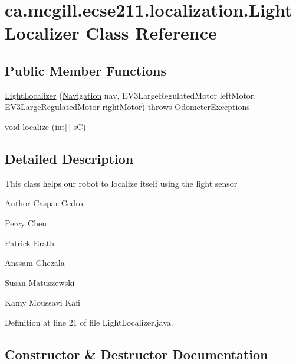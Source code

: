 \hypertarget{classca_1_1mcgill_1_1ecse211_1_1localization_1_1_light_localizer}{}\section{ca.\+mcgill.\+ecse211.\+localization.\+Light\+Localizer Class Reference}
\label{classca_1_1mcgill_1_1ecse211_1_1localization_1_1_light_localizer}
\subsection*{Public Member Functions}
\begin{DoxyCompactItemize}
\item 
\hyperlink{classca_1_1mcgill_1_1ecse211_1_1localization_1_1_light_localizer_aa37a75b7c32c02fe261845021f0734b7}{Light\+Localizer} (\hyperlink{classca_1_1mcgill_1_1ecse211_1_1project_1_1_navigation}{Navigation} nav, E\+V3\+Large\+Regulated\+Motor left\+Motor, E\+V3\+Large\+Regulated\+Motor right\+Motor)  throws Odometer\+Exceptions 
\item 
void \hyperlink{classca_1_1mcgill_1_1ecse211_1_1localization_1_1_light_localizer_a9fc3d6cdd897e9db86fc9d71dc914863}{localize} (int\mbox{[}$\,$\mbox{]} sC)
\end{DoxyCompactItemize}


\subsection{Detailed Description}
This class helps our robot to localize itself using the light sensor

\begin{DoxyAuthor}{Author}
Caspar Cedro 

Percy Chen 

Patrick Erath 

Anssam Ghezala 

Susan Matuszewski 

Kamy Moussavi Kafi 
\end{DoxyAuthor}


Definition at line 21 of file Light\+Localizer.\+java.



\subsection{Constructor \& Destructor Documentation}
\mbox{\label{classca_1_1mcgill_1_1ecse211_1_1localization_1_1_light_localizer_aa37a75b7c32c02fe261845021f0734b7}} 
